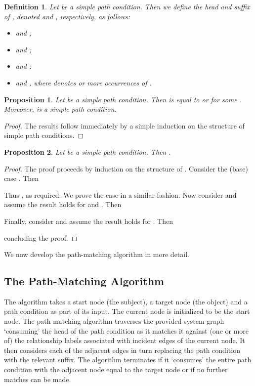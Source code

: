 \documentclass{article}
\newtheorem{definition}{Definition}
\newtheorem{proposition}{Proposition}
\begin{document}
\begin{definition}\label{def:HeadAndSuffix}
Let  be a simple path condition.
Then we define the \emph{head} and \emph{suffix} of , denoted  and , respectively, as follows:
\begin{itemize}
 \item  and ;
 \item  and ;
 \item  and ;
 \item  and , where  denotes  or more occurrences of .
\end{itemize}
\end{definition}

\begin{proposition}\label{def:head-path-condition-equals-edge}
 Let  be a simple path condition.
 Then  is equal to  or  for some .
 Moreover,  is a simple path condition.
\end{proposition}

\begin{proof}
 The results follow immediately by a simple induction on the structure of simple path conditions.
\end{proof}


\begin{proposition}\label{pro:path-condition-equiv-head-comp-suffix}
 Let  be a simple path condition.
 Then .
\end{proposition}

\begin{proof}
 The proof proceeds by induction on the structure of .
 Consider the (base) case . Then
  
 Thus , as required.
 We prove the case  in a similar fashion.
 Now consider  and assume the result holds for  and .
 Then
  
 Finally, consider  and assume the result holds for .
 Then
  
 concluding the proof.
\end{proof}

We now develop the path-matching algorithm in more detail.

\subsection{The Path-Matching Algorithm}\label{sec:Algorithm:Description}

The algorithm takes a start node (the subject), a target node (the object) and a path condition as part of its input.
The current node is initialized to be the start node.
The path-matching algorithm traverses the provided system graph `consuming' the head of the path condition as it matches it against (one or more of) the relationship labels associated with incident edges of the current node.
It then considers each of the adjacent edges in turn replacing the path condition with the relevant suffix.
The algorithm terminates if it `consumes' the entire path condition with the adjacent node equal to the target node or if no further matches can be made.
\end{document}
